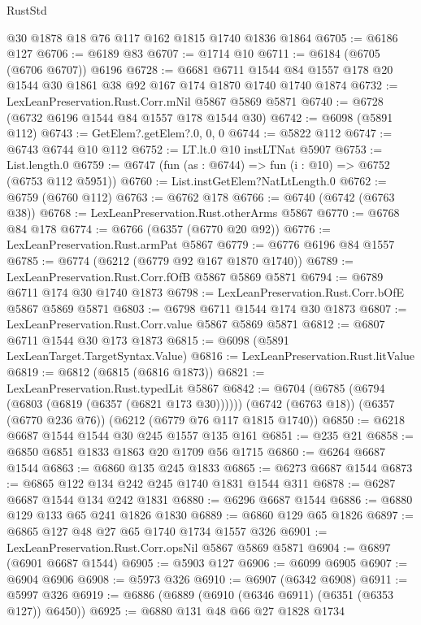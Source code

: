 \begin{lexlean}{RustStd}
\begin{coremodule}
    @30
    @1878
    @18
    @76
    @117
    @162
    @1815
    @1740
    @1836
    @1864
@6705 := @6186 @127
@6706 := @6189 @83
@6707 := @1714 @10
@6711 := @6184 (@6705 (@6706 @6707)) @6196
@6728 := @6681
    @6711
    @1544
    @84
    @1557
    @178
    @20
    @1544
    @30
    @1861
    @38
    @92
    @167
    @174
    @1870
    @1740
    @1740
    @1874
@6732 := LexLeanPreservation.Rust.Corr.mNil @5867 @5869 @5871
@6740 := @6728 (@6732 @6196 @1544 @84 @1557 @178 @1544 @30)
@6742 := @6098 (@5891 @112)
@6743 := GetElem?.getElem?.{0, 0, 0}
@6744 := @5822 @112
@6747 := @6743 @6744 @10 @112
@6752 := LT.lt.{0} @10 instLTNat @5907
@6753 := List.length.{0}
@6759 := @6747 (fun (as : @6744) => fun (i : @10) => @6752 (@6753 @112 @5951))
@6760 := List.instGetElem?NatLtLength.{0}
@6762 := @6759 (@6760 @112)
@6763 := @6762 @178
@6766 := @6740 (@6742 (@6763 @38))
@6768 := LexLeanPreservation.Rust.otherArms @5867
@6770 := @6768 @84 @178
@6774 := @6766 (@6357 (@6770 @20 @92))
@6776 := LexLeanPreservation.Rust.armPat @5867
@6779 := @6776 @6196 @84 @1557
@6785 := @6774 (@6212 (@6779 @92 @167 @1870 @1740))
@6789 := LexLeanPreservation.Rust.Corr.fOfB @5867 @5869 @5871
@6794 := @6789 @6711 @174 @30 @1740 @1873
@6798 := LexLeanPreservation.Rust.Corr.bOfE @5867 @5869 @5871
@6803 := @6798 @6711 @1544 @174 @30 @1873
@6807 := LexLeanPreservation.Rust.Corr.value @5867 @5869 @5871
@6812 := @6807 @6711 @1544 @30 @173 @1873
@6815 := @6098 (@5891 LexLeanTarget.TargetSyntax.Value)
@6816 := LexLeanPreservation.Rust.litValue
@6819 := @6812 (@6815 (@6816 @1873))
@6821 := LexLeanPreservation.Rust.typedLit @5867
@6842 := @6704
    (@6785 (@6794 (@6803 (@6819 (@6357 (@6821 @173 @30))))))
    (@6742 (@6763 @18))
    (@6357 (@6770 @236 @76))
    (@6212 (@6779 @76 @117 @1815 @1740))
@6850 := @6218 @6687 @1544 @1544 @30 @245 @1557 @135 @161
@6851 := @235 @21
@6858 := @6850 @6851 @1833 @1863 @20 @1709 @56 @1715
@6860 := @6264 @6687 @1544
@6863 := @6860 @135 @245 @1833
@6865 := @6273 @6687 @1544
@6873 := @6865 @122 @134 @242 @245 @1740 @1831 @1544 @311
@6878 := @6287 @6687 @1544 @134 @242 @1831
@6880 := @6296 @6687 @1544
@6886 := @6880 @129 @133 @65 @241 @1826 @1830
@6889 := @6860 @129 @65 @1826
@6897 := @6865 @127 @48 @27 @65 @1740 @1734 @1557 @326
@6901 := LexLeanPreservation.Rust.Corr.opsNil @5867 @5869 @5871
@6904 := @6897 (@6901 @6687 @1544)
@6905 := @5903 @127
@6906 := @6099 @6905
@6907 := @6904 @6906
@6908 := @5973 @326
@6910 := @6907 (@6342 @6908)
@6911 := @5997 @326
@6919 := @6886 (@6889 (@6910 (@6346 @6911) (@6351 (@6353 @127)) @6450))
@6925 := @6880 @131 @48 @66 @27 @1828 @1734

\end{coremodule}
\end{lexlean}
